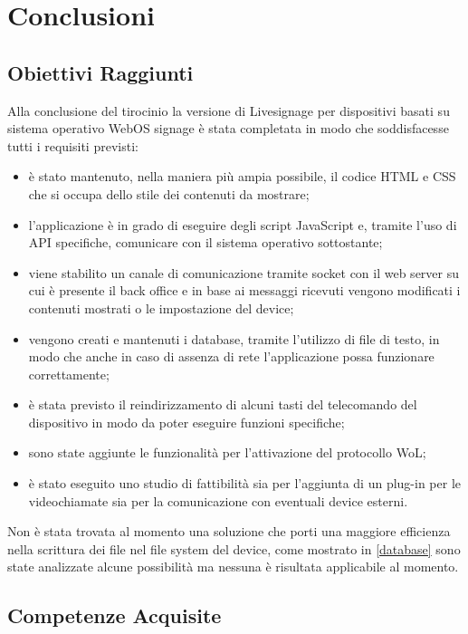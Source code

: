 \chapter{Conclusioni}

\section{Obiettivi Raggiunti}
Alla conclusione del tirocinio la versione di Livesignage per dispositivi basati su sistema operativo WebOS signage è stata completata in modo che soddisfacesse tutti i requisiti previsti:

\begin{itemize}
    \item è stato mantenuto, nella maniera più ampia possibile, il codice HTML e CSS che si occupa dello stile dei contenuti da mostrare;
    \item l'applicazione è in grado di eseguire degli script JavaScript e, tramite l'uso di API specifiche, comunicare con il sistema operativo sottostante;
    \item viene stabilito un canale di comunicazione tramite socket con il web server su cui è presente il back office e in base ai messaggi ricevuti vengono modificati i contenuti mostrati o le impostazione del device;
    \item vengono creati e mantenuti i database, tramite l'utilizzo di file di testo, in modo che anche in caso di assenza di rete l'applicazione possa funzionare correttamente;
    \item è stata previsto il reindirizzamento di alcuni tasti del telecomando del dispositivo in modo da poter eseguire funzioni specifiche;
    \item sono state aggiunte le funzionalità per l'attivazione del protocollo WoL;
    \item è stato eseguito uno studio di fattibilità sia per l'aggiunta di un plug-in per le videochiamate sia per la comunicazione con eventuali device esterni.
\end{itemize}

Non è stata trovata al momento una soluzione che porti una maggiore efficienza nella scrittura dei file nel file system del device, come mostrato in \ref*{database} sono state analizzate alcune possibilità ma nessuna è risultata applicabile al momento.


\section{Competenze Acquisite}

